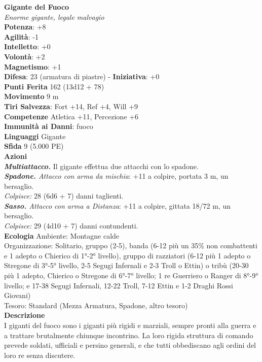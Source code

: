 \begin{multicols}{2}
\medskip\textbf{Gigante del Fuoco}\\
\emph{Enorme gigante, legale malvagio}\\
\textbf{Potenza}: +8\\
\textbf{Agilità}: -1\\
\textbf{Intelletto}: +0\\
\textbf{Volontà}: +2\\
\textbf{Magnetismo}: +1\\
\textbf{Difesa}: 23 (armatura di piastre) - \textbf{Iniziativa}: +0\\
\textbf{Punti Ferita} 162 (13d12 + 78)\\
\textbf{Movimento} 9 m\\
\textbf{Tiri Salvezza}: Fort +14, Ref +4, Will +9\\
\textbf{Competenze} Atletica +11, Percezione +6\\
\textbf{Immunità ai Danni}: fuoco\\
\textbf{Linguaggi} Gigante\\
\textbf{Sfida} 9 (5.000 PE)\smallskip\\
\smallskip\textbf{Azioni}\\
\emph{\textbf{Multiattacco.}} Il gigante effettua due attacchi con lo spadone.\\
\emph{\textbf{Spadone.} Attacco con arma da mischia}: +11 a colpire, portata 3 m, un bersaglio.\\
\emph{Colpisce:} 28 (6d6 + 7) danni taglienti.\\
\emph{\textbf{Sasso.} Attacco con arma a Distanza}: +11 a colpire, gittata 18/72 m, un bersaglio.\\
\emph{Colpisce:} 29 (4d10 + 7) danni contundenti. \\
\textbf{Ecologia}
Ambiente: Montagne calde\\
Organizzazione: Solitario, gruppo (2-5), banda (6-12 più un 35\% non combattenti e 1 adepto o Chierico di 1°-2° livello), gruppo di razziatori (6-12 più 1 adepto o Stregone di 3°-5° livello, 2-5 Segugi Infernali e 2-3 Troll o Ettin) o tribù (20-30 più 1 adepto, Chierico o Stregone di 6°-7° livello; 1 re Guerriero o Ranger di 8°-9° livello; e 17-38 Segugi Infernali, 12-22 Troll, 7-12 Ettin e 1-2 Draghi Rossi Giovani)\\
Tesoro: Standard (Mezza Armatura, Spadone, altro tesoro)\\
\textbf{Descrizione}\\
I giganti del fuoco sono i giganti più rigidi e marziali, sempre pronti alla guerra e a trattare brutalmente chiunque incontrino. La loro rigida struttura di comando prevede soldati, ufficiali e persino generali, e che tutti obbediscano agli ordini del loro re senza discutere.\\


\end{multicols}
